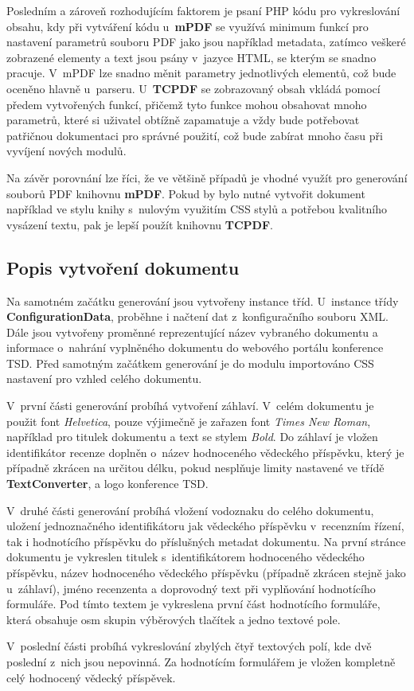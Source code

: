 \par
Posledním a zároveň rozhodujícím faktorem je psaní PHP kódu pro vykreslování obsahu, kdy při vytváření kódu u~\textbf{mPDF} se využívá minimum funkcí pro nastavení parametrů souboru PDF jako jsou například metadata, zatímco veškeré zobrazené elementy a text jsou psány v~jazyce HTML, se kterým se snadno pracuje. V~mPDF lze snadno měnit parametry jednotlivých elementů, což bude oceněno hlavně u~parseru. U~\textbf{TCPDF} se zobrazovaný obsah vkládá pomocí předem vytvořených funkcí, přičemž tyto funkce mohou obsahovat mnoho parametrů, které si uživatel obtížně zapamatuje a vždy bude potřebovat patřičnou dokumentaci pro správné použití, což bude zabírat mnoho času při vyvíjení nových modulů.
\par
Na závěr porovnání lze říci, že ve většině případů je vhodné využít pro generování souborů PDF knihovnu \textbf{mPDF}. Pokud by bylo nutné vytvořit dokument například ve stylu knihy s~nulovým využitím CSS stylů a potřebou kvalitního vysázení textu, pak je lepší použít knihovnu \textbf{TCPDF}. 

\subsection{Popis vytvoření dokumentu}
Na samotném začátku generování jsou vytvořeny instance tříd. U~instance třídy \textbf{ConfigurationData}, proběhne i načtení dat z~konfiguračního souboru XML. Dále jsou vytvořeny proměnné reprezentující název vybraného dokumentu a informace o~nahrání vyplněného dokumentu do webového portálu konference TSD. Před samotným začátkem generování je do modulu importováno CSS nastavení pro vzhled celého dokumentu.
\par
V~první části generování probíhá vytvoření záhlaví. V~celém dokumentu je použit font \textit{Helvetica}, pouze výjimečně je zařazen font \textit{Times New Roman}, například pro titulek dokumentu a text se stylem \textit{Bold}. Do záhlaví je vložen identifikátor recenze doplněn o~název hodnoceného vědeckého příspěvku, který je případně zkrácen na určitou délku, pokud nesplňuje limity nastavené ve třídě \textbf{TextConverter}, a logo konference TSD. 
\par
V~druhé části generování probíhá vložení vodoznaku do celého dokumentu, uložení jednoznačného identifikátoru jak vědeckého příspěvku v~recenzním řízení, tak i hodnotícího příspěvku do příslušných metadat dokumentu. Na první stránce dokumentu je vykreslen titulek s~identifikátorem hodnoceného vědeckého příspěvku, název hodnoceného vědeckého příspěvku (případně zkrácen stejně jako u~záhlaví), jméno recenzenta a doprovodný text při vyplňování hodnotícího formuláře. Pod tímto textem je vykreslena první část hodnotícího formuláře, která obsahuje osm skupin výběrových tlačítek a jedno textové pole.
\par
V~poslední části probíhá vykreslování zbylých čtyř textových polí, kde dvě poslední z~nich jsou nepovinná. Za hodnotícím formulářem je vložen kompletně celý hodnocený vědecký příspěvek.
